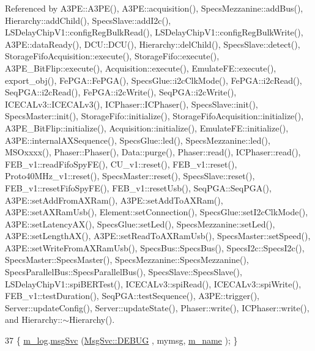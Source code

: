 Referenced by A3\+P\+E\+::\+A3\+P\+E(), A3\+P\+E\+::acquisition(), Specs\+Mezzanine\+::add\+Bus(), Hierarchy\+::add\+Child(), Specs\+Slave\+::add\+I2c(), L\+S\+Delay\+Chip\+V1\+::config\+Reg\+Bulk\+Read(), L\+S\+Delay\+Chip\+V1\+::config\+Reg\+Bulk\+Write(), A3\+P\+E\+::data\+Ready(), D\+C\+U\+::\+D\+C\+U(), Hierarchy\+::del\+Child(), Specs\+Slave\+::detect(), Storage\+Fifo\+Acquisition\+::execute(), Storage\+Fifo\+::execute(), A3\+P\+E\+\_\+\+Bit\+Flip\+::execute(), Acquisition\+::execute(), Emulate\+F\+E\+::execute(), export\+\_\+obj(), Fe\+P\+G\+A\+::\+Fe\+P\+G\+A(), Specs\+Glue\+::i2c\+Clk\+Mode(), Fe\+P\+G\+A\+::i2c\+Read(), Seq\+P\+G\+A\+::i2c\+Read(), Fe\+P\+G\+A\+::i2c\+Write(), Seq\+P\+G\+A\+::i2c\+Write(), I\+C\+E\+C\+A\+Lv3\+::\+I\+C\+E\+C\+A\+Lv3(), I\+C\+Phaser\+::\+I\+C\+Phaser(), Specs\+Slave\+::init(), Specs\+Master\+::init(), Storage\+Fifo\+::initialize(), Storage\+Fifo\+Acquisition\+::initialize(), A3\+P\+E\+\_\+\+Bit\+Flip\+::initialize(), Acquisition\+::initialize(), Emulate\+F\+E\+::initialize(), A3\+P\+E\+::internal\+A\+X\+Sequence(), Specs\+Glue\+::led(), Specs\+Mezzanine\+::led(), M\+S\+Oxxxx(), Phaser\+::\+Phaser(), Data\+::purge(), Phaser\+::read(), I\+C\+Phaser\+::read(), F\+E\+B\+\_\+v1\+::read\+Fifo\+Spy\+F\+E(), C\+U\+\_\+v1\+::reset(), F\+E\+B\+\_\+v1\+::reset(), Proto40\+M\+Hz\+\_\+v1\+::reset(), Specs\+Master\+::reset(), Specs\+Slave\+::reset(), F\+E\+B\+\_\+v1\+::reset\+Fifo\+Spy\+F\+E(), F\+E\+B\+\_\+v1\+::reset\+Usb(), Seq\+P\+G\+A\+::\+Seq\+P\+G\+A(), A3\+P\+E\+::set\+Add\+From\+A\+X\+Ram(), A3\+P\+E\+::set\+Add\+To\+A\+X\+Ram(), A3\+P\+E\+::set\+A\+X\+Ram\+Usb(), Element\+::set\+Connection(), Specs\+Glue\+::set\+I2c\+Clk\+Mode(), A3\+P\+E\+::set\+Latency\+A\+X(), Specs\+Glue\+::set\+Led(), Specs\+Mezzanine\+::set\+Led(), A3\+P\+E\+::set\+Length\+A\+X(), A3\+P\+E\+::set\+Read\+To\+A\+X\+Ram\+Usb(), Specs\+Master\+::set\+Speed(), A3\+P\+E\+::set\+Write\+From\+A\+X\+Ram\+Usb(), Specs\+Bus\+::\+Specs\+Bus(), Specs\+I2c\+::\+Specs\+I2c(), Specs\+Master\+::\+Specs\+Master(), Specs\+Mezzanine\+::\+Specs\+Mezzanine(), Specs\+Parallel\+Bus\+::\+Specs\+Parallel\+Bus(), Specs\+Slave\+::\+Specs\+Slave(), L\+S\+Delay\+Chip\+V1\+::spi\+B\+E\+R\+Test(), I\+C\+E\+C\+A\+Lv3\+::spi\+Read(), I\+C\+E\+C\+A\+Lv3\+::spi\+Write(), F\+E\+B\+\_\+v1\+::test\+Duration(), Seq\+P\+G\+A\+::test\+Sequence(), A3\+P\+E\+::trigger(), Server\+::update\+Config(), Server\+::update\+State(), Phaser\+::write(), I\+C\+Phaser\+::write(), and Hierarchy\+::$\sim$\+Hierarchy().


\begin{DoxyCode}
37 \{ \hyperlink{classObject_a0d269813dd7ac1f24bc143031e2963f2}{m\_log}.\hyperlink{classMsgSvc_ad25f18047920cc59a314e5098259711c}{msgSvc} (\hyperlink{classMsgSvc_ae671eb7301996cd049d2da8a65925926a1dbdcc82dce88370ec335883c83b38b0}{MsgSvc::DEBUG}   , mymsg, \hyperlink{classObject_a8b83c95c705d2c3ba0d081fe1710f48d}{m\_name} ); \}
\end{DoxyCode}
\mbox{\label{classObject_a6c9a0397ca804e04d675ed05683f5420}} 

